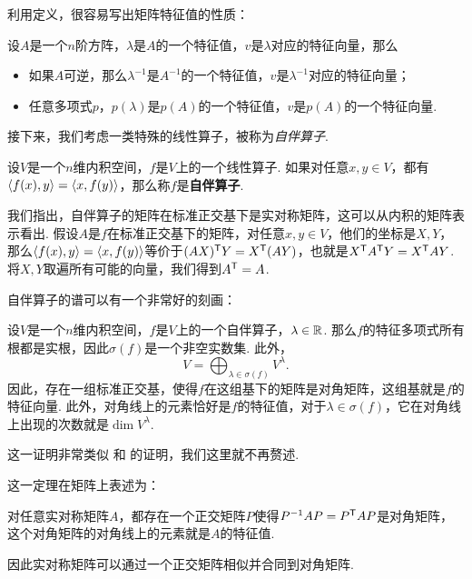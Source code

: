 利用定义，很容易写出矩阵特征值的性质：
\begin{proposition}
设$A$是一个$n$阶方阵，$\lambda$是$A$的一个特征值，$v$是$\lambda$对应的特征向量，那么
\begin{itemize}
    \item 如果$A$可逆，那么$\lambda^{-1}$是$A^{-1}$的一个特征值，$v$是$\lambda^{-1}$对应的特征向量；
    \item 任意多项式$p$，$p(\lambda)$是$p(A)$的一个特征值，$v$是$p(A)$的一个特征向量. 
\end{itemize}
\end{proposition}

接下来，我们考虑一类特殊的线性算子，被称为\textit{自伴算子}.

\begin{definition}[自伴算子]
设$V$是一个$n$维内积空间，$f$是$V$上的一个线性算子. 如果对任意$x,y\in V$，都有$\left\langle{f(x)},{y}\right\rangle=\left\langle{x},{f(y)}\right\rangle$，那么称$f$是\textbf{自伴算子}. 
\end{definition}

我们指出，自伴算子的矩阵在标准正交基下是实对称矩阵，这可以从内积的矩阵表示看出. 假设$A$是$f$在标准正交基下的矩阵，对任意$x,y\in V$，他们的坐标是$X,Y$，那么$\left\langle{f(x)},{y}\right\rangle=\left\langle{x},{f(y)}\right\rangle$等价于$(AX)^{\mathsf{T}} Y=X^{\mathsf{T}}(AY)$，也就是$X^{\mathsf{T}} A^{\mathsf{T}} Y=X^{\mathsf{T}} AY$. 将$X,Y$取遍所有可能的向量，我们得到$A^{\mathsf{T}}=A$.

自伴算子的谱可以有一个非常好的刻画：
\begin{theorem}\label{thm:symmetric-operator-spectrum}
    设$V$是一个$n$维内积空间，$f$是$V$上的一个自伴算子，$\lambda\in\mathbb{R}$. 那么$f$的特征多项式所有根都是实根，因此$\sigma(f)$是一个非空实数集. 此外，
    \[V=\bigoplus_{\lambda\in\sigma(f)}V^\lambda.\]
    因此，存在一组标准正交基，使得$f$在这组基下的矩阵是对角矩阵，这组基就是$f$的特征向量. 此外，对角线上的元素恰好是$f$的特征值，对于$\lambda\in\sigma(f)$，它在对角线上出现的次数就是$\dim V^\lambda$. 
\end{theorem}

这一证明非常类似 和 的证明，我们这里就不再赘述. 

这一定理在矩阵上表述为：
\begin{corollary}\label{cor:symmetric-matrix-spectrum}
对任意实对称矩阵$A$，都存在一个正交矩阵$P$使得$P^{-1}AP=P^{\mathsf{T}} AP$是对角矩阵，这个对角矩阵的对角线上的元素就是$A$的特征值. 
\end{corollary}

因此实对称矩阵可以通过一个正交矩阵相似并合同到对角矩阵. 

